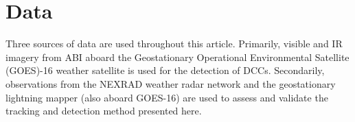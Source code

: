 \documentclass[amt, manuscript]{copernicus}
\begin{document}



\section{Data}

Three sources of data are used throughout this article.
Primarily, visible and IR imagery from ABI aboard the Geostationary Operational Environmental Satellite (GOES)-16 weather satellite is used for the detection of DCCs.
Secondarily, observations from the NEXRAD weather radar network and the geostationary lightning mapper (also aboard GOES-16) are used to assess and validate the tracking and detection method presented here.
\end{document}
